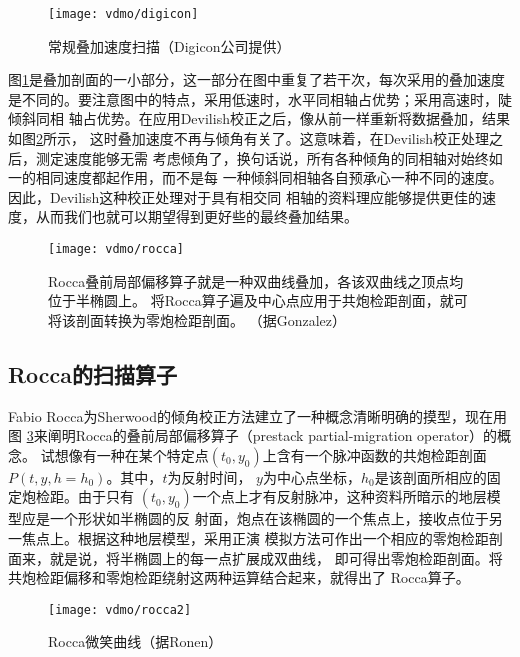 \begin{figure}[H]
\centering
\texttt{[image: vdmo/digicon]}
\caption[digicon]{常规叠加速度扫描（Digicon公司提供）}
\label{fig:vdmo/digicon}
\end{figure}

图\ref{fig:vdmo/digicon}是叠加剖面的一小部分，这一部分在图中重复了若干次，每次采用的叠加速度
是不同的。要注意图中的特点，采用低速时，水平同相轴占优势；采用高速时，陡倾斜同相
轴占优势。在应用Devilish校正之后，像从前一样重新将数据叠加，结果如图\ref{fig:vdmo/rocca}所示，
这时叠加速度不再与倾角有关了。这意味着，在Devilish校正处理之后，测定速度能够无需
考虑倾角了，换句话说，所有各种倾角的同相轴对始终如一的相同速度都起作用，而不是每
一种倾斜同相轴各自预承心一种不同的速度。因此，Devilish这种校正处理对于具有相交同
相轴的资料理应能够提供更佳的速度，从而我们也就可以期望得到更好些的最终叠加结果。

\begin{figure}[H]
\centering
\texttt{[image: vdmo/rocca]}
\caption[rocca]{Rocca叠前局部偏移算子就是一种双曲线叠加，各该双曲线之顶点均位于半椭圆上。
将Rocca算子遍及中心点应用于共炮检距剖面，就可将该剖面转换为零炮检距剖面。
（据Gonzalez）}
\label{fig:vdmo/rocca}
\end{figure}

\subsection{Rocca的扫描算子}
\label{sec:3.6.2}

Fabio Rocca为Sherwood的倾角校正方法建立了一种概念清晰明确的摸型，现在用图
\ref{fig:vdmo/rocca2}来阐明Rocca的叠前局部偏移算子（prestack partial-migration operator）的概念。
试想像有一种在某个特定点$(t_0,y_0)$上含有一个脉冲函数的共炮检距剖面$P(t,y,h=h_0)$。其中，$t$为反射时间，
$y$为中心点坐标，$h_0$是该剖面所相应的固定炮检距。由于只有
$(t_0,y_0)$一个点上才有反射脉冲，这种资料所暗示的地层模型应是一个形状如半椭圆的反
射面，炮点在该椭圆的一个焦点上，接收点位于另一焦点上。根据这种地层模型，采用正演
模拟方法可作出一个相应的零炮检距剖面来，就是说，将半椭圆上的每一点扩展成双曲线，
即可得出零炮检距剖面。将共炮检距偏移和零炮检距绕射这两种运算结合起来，就得出了
Rocca算子。

\begin{figure}[H]
\centering
\texttt{[image: vdmo/rocca2]}
\caption[rocca2]{Rocca微笑曲线（据Ronen）}
\label{fig:vdmo/rocca2}
\end{figure}



